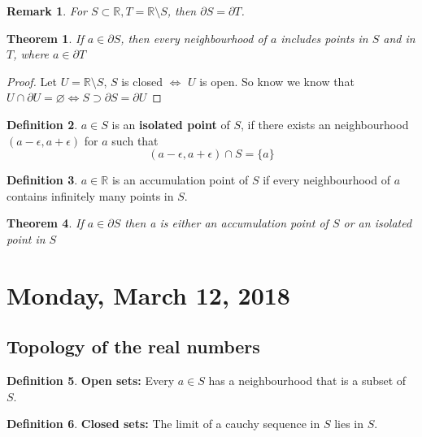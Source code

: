 \documentclass[12pt]{article}
\theoremstyle{plain}
\newtheorem*{remark}{Remark}
\newtheorem{theorem}{Theorem}[section]
\theoremstyle{definition}
\newtheorem{definition}[theorem]{Definition}
\begin{document}
\begin{remark}
	For $S \subset \mathbb{R}, T=\mathbb{R} \setminus S$, then $\partial S = \partial T$.
\end{remark}

\begin{theorem}
	If $a\in \partial S$, then every neighbourhood of $a$ includes points in $S$ and in $T$, where $a\in\partial T$
\end{theorem}

\begin{proof}
	Let $U = \mathbb{R} \setminus S$, $S$ is closed $\Longleftrightarrow$ $U$ is open. So know we know that $U \cap \partial U = \varnothing \Longleftrightarrow S \supset \partial S = \partial U$
\end{proof}

\begin{definition}
	$a\in S$ is an \textbf{isolated point} of $S$, if there exists an neighbourhood $(a-\epsilon, a+\epsilon)$ for $a$ such that $$(a-\epsilon, a+\epsilon) \cap S = \{ a \}$$
\end{definition}

\begin{definition}
	$a\in\mathbb{R}$ is an accumulation point of $S$ if every neighbourhood of $a$ contains infinitely many points in $S$.
\end{definition}

\begin{theorem}
	If $a\in \partial S$ then a is either an accumulation point of $S$ or an isolated point in $S$
\end{theorem}


\newpage

\section{Monday, March 12, 2018}

\subsection{Topology of the real numbers}

\begin{definition}
	\textbf{Open sets:} Every $a\in S$ has a neighbourhood that is a subset of $S$.
\end{definition}

\begin{definition}
	\textbf{Closed sets:} The limit of a cauchy sequence in $S$ lies in $S$.
\end{definition}
\end{document}

